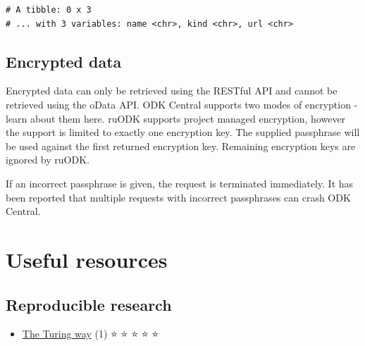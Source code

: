 \documentclass[
  letterpaper,
  DIV=11,
  numbers=noendperiod]{scrreprt}
\providecommand{\tightlist}{%
  \setlength{\itemsep}{0pt}\setlength{\parskip}{0pt}}\usepackage{longtable,booktabs,array}
\begin{document}
\begin{verbatim}
# A tibble: 0 x 3
# ... with 3 variables: name <chr>, kind <chr>, url <chr>
\end{verbatim}

\hypertarget{encrypted-data}{%
\section{Encrypted data}\label{encrypted-data}}

Encrypted data can only be retrieved using the RESTful API and cannot be
retrieved using the oData API. ODK Central supports two modes of
encryption - learn about them here. ruODK supports project managed
encryption, however the support is limited to exactly one encryption
key. The supplied passphrase will be used against the first returned
encryption key. Remaining encryption keys are ignored by ruODK.

\begin{tcolorbox}[enhanced jigsaw, colframe=quarto-callout-important-color-frame, colback=white, rightrule=.15mm, bottomrule=.15mm, left=2mm, arc=.35mm, coltitle=black, title=\textcolor{quarto-callout-important-color}{\faExclamation}\hspace{0.5em}{Important}, opacitybacktitle=0.6, bottomtitle=1mm, opacityback=0, toptitle=1mm, toprule=.15mm, colbacktitle=quarto-callout-important-color!10!white, titlerule=0mm, leftrule=.75mm, breakable]
If an incorrect passphrase is given, the request is terminated
immediately. It has been reported that multiple requests with incorrect
passphrases can crash ODK Central.
\end{tcolorbox}

\hypertarget{sec-useful-resources}{%
\chapter{Useful resources}\label{sec-useful-resources}}

\hypertarget{reproducible-research}{%
\section{Reproducible research}\label{reproducible-research}}

\begin{itemize}
\tightlist
\item
  \href{https://the-turing-way.netlify.app/welcome.html}{The Turing way}
  (1) {⭐} {⭐} {⭐} {⭐} {⭐}
\end{itemize}
\end{document}
